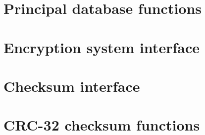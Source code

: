 \section{Principal database functions}



\section{Encryption system interface}


\section{Checksum interface}


\section{CRC-32 checksum functions}


\appendix
\cleardoublepage


